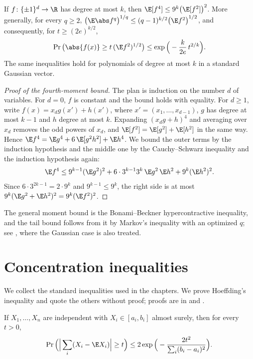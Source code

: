 \begin{refsection}
\begin{theorem}\label{thm:toolkit:bonami}
If $f\colon\{\pm1\}^d\to\R$ has degree at most $k$, then $\E[f^4]\le9^k\big(\E[f^2]\big)^2$. More generally, for every $q\ge2$, $\big(\E\abs f^q\big)^{1/q}\le(q-1)^{k/2}\big(\E f^2\big)^{1/2}$, and consequently, for $t\ge(2e)^{k/2}$,
\[
  \Pr\big(\abs{f(x)}\ge t\,(\E f^2)^{1/2}\big)\le\exp\Big(-\frac k{2e}\,t^{2/k}\Big).
\]
The same inequalities hold for polynomials of degree at most $k$ in a standard Gaussian vector.
\end{theorem}

\begin{proof}[Proof of the fourth-moment bound]
The plan is induction on the number $d$ of variables. For $d=0$, $f$ is constant and the bound holds with equality. For $d\ge1$, write $f(x)=x_dg(x')+h(x')$, where $x'=(x_1,\dots,x_{d-1})$, $g$ has degree at most $k-1$ and $h$ degree at most $k$. Expanding $(x_dg+h)^4$ and averaging over $x_d$ removes the odd powers of $x_d$, and $\E[f^2]=\E[g^2]+\E[h^2]$ in the same way. Hence $\E f^4=\E g^4+6\,\E[g^2h^2]+\E h^4$. We bound the outer terms by the induction hypothesis and the middle one by the Cauchy--Schwarz inequality and the induction hypothesis again:
\[
  \E f^4\le9^{k-1}(\E g^2)^2+6\cdot3^{k-1}3^k\,\E g^2\,\E h^2+9^k(\E h^2)^2 .
\]
Since $6\cdot3^{2k-1}=2\cdot9^k$ and $9^{k-1}\le9^k$, the right side is at most $9^k(\E g^2+\E h^2)^2=9^k(\E f^2)^2$.
\end{proof}

The general moment bound is the Bonami--Beckner hypercontractive inequality, and the tail bound follows from it by Markov's inequality with an optimized $q$; see \textcite[Chapters~9 and~11]{ODonnell2014}, where the Gaussian case is also treated.

\section{Concentration inequalities}\label{sec:toolkit:conc}

We collect the standard inequalities used in the chapters. We prove Hoeffding's inequality and quote the others without proof; proofs are in \textcite{BoucheronLugosiMassart2013} and \textcite{Vershynin2018}.

\begin{theorem}\label{thm:toolkit:hoeffding}
If $X_1,\dots,X_n$ are independent with $X_i\in[a_i,b_i]$ almost surely, then for every $t>0$,
\[
  \Pr\Big(\Big|\sum_i(X_i-\E X_i)\Big|\ge t\Big)\le2\exp\Big(-\frac{2t^2}{\sum_i(b_i-a_i)^2}\Big).
\]
\end{theorem}


\end{refsection}
